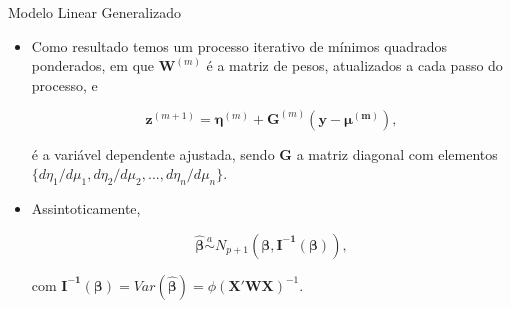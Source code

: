 \documentclass[10pt, aspectratio=169]{beamer}
\begin{document}


\begin{frame}{Modelo Linear Generalizado} 

\begin{itemize}

\item Como resultado temos um processo iterativo de mínimos quadrados ponderados, em que $\boldsymbol{W}^{(m)}$ é a matriz de pesos, atualizados a cada passo do processo, e

$$
    \boldsymbol{z}^{(m+1)}=\boldsymbol{\eta}^{(m)}+\boldsymbol{G}^{(m)}\boldsymbol{(y-\mu^{(m)})},
$$

é a variável dependente ajustada, sendo $\boldsymbol{G}$ a matriz diagonal com elementos $\{d\eta_{1}/d\mu_{1},
d\eta_{2}/d\mu_{2},...,d\eta_{n}/d\mu_{n}\}.$

\item Assintoticamente,

$$
    \boldsymbol{\hat{\beta}}\overset{a}{\sim} N_{p+1}\left ( \boldsymbol{\beta}, \boldsymbol{I^{-1}\left ( \boldsymbol{\beta} \right )} \right ),
$$

com $\boldsymbol{I^{-1}(\boldsymbol{\beta})}=Var(\boldsymbol{\hat{\beta}})=\phi (\boldsymbol{X'WX})^{-1}$. 


\end{itemize}

\end{frame}






\end{document}
